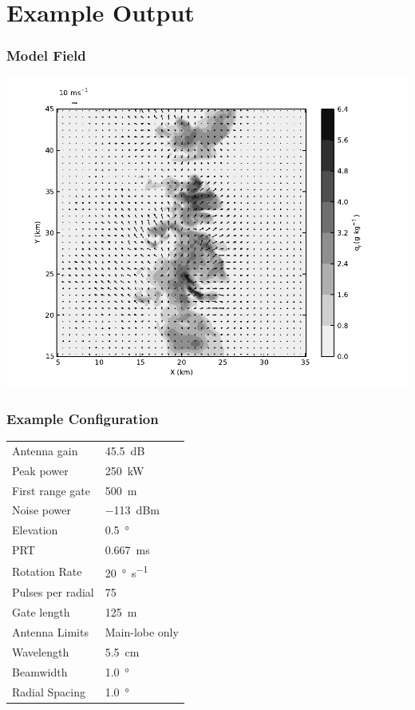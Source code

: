 \documentclass[red]{beamer}
\begin{document}
\section{Example Output}
\begin{frame}
	\frametitle{Model Field}
	\begin{center}
		\includegraphics[scale=0.5]{figures/commas_wz_3600_qr_wind_vectors.pdf}	
	\end{center}
\end{frame}

\begin{frame}
	\frametitle{Example Configuration}
	\begin{center}
	    \begin{tabular}{ | l | l | }
	        \hline
	        Antenna gain & \SI{45.5}{dB} \\
	        Peak power & \SI{250}{\kilo\watt} \\
	        First range gate & \SI{500}{\meter} \\
	        Noise power & \SI{-113}{dBm} \\
	        Elevation & \SI{0.5}{\degree} \\
	        PRT & \SI{0.667}{\milli\second} \\
	        Rotation Rate & \SI{20}{\degree\per\second} \\
	        Pulses per radial & \num{75} \\
	        Gate length & \SI{125}{\meter} \\
	        Antenna Limits & Main-lobe only \\
			Wavelength &  \SI{5.5}{\centi\meter} \\
			Beamwidth & \SI{1.0}{\degree} \\
			Radial Spacing & \SI{1.0}{\degree} \\
			\hline
	    \end{tabular}
	\end{center}
\end{frame}
\end{document}
